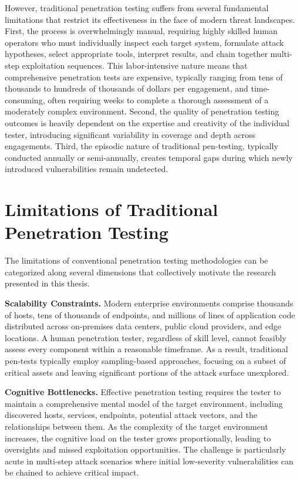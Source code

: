 However, traditional penetration testing suffers from several fundamental limitations that restrict its effectiveness in the face of modern threat landscapes. First, the process is overwhelmingly manual, requiring highly skilled human operators who must individually inspect each target system, formulate attack hypotheses, select appropriate tools, interpret results, and chain together multi-step exploitation sequences. This labor-intensive nature means that comprehensive penetration tests are expensive, typically ranging from tens of thousands to hundreds of thousands of dollars per engagement, and time-consuming, often requiring weeks to complete a thorough assessment of a moderately complex environment. Second, the quality of penetration testing outcomes is heavily dependent on the expertise and creativity of the individual tester, introducing significant variability in coverage and depth across engagements. Third, the episodic nature of traditional pen-testing, typically conducted annually or semi-annually, creates temporal gaps during which newly introduced vulnerabilities remain undetected.

\section{Limitations of Traditional Penetration Testing}
\label{sec:limitations}

The limitations of conventional penetration testing methodologies can be categorized along several dimensions that collectively motivate the research presented in this thesis.

\textbf{Scalability Constraints.} Modern enterprise environments comprise thousands of hosts, tens of thousands of endpoints, and millions of lines of application code distributed across on-premises data centers, public cloud providers, and edge locations. A human penetration tester, regardless of skill level, cannot feasibly assess every component within a reasonable timeframe. As a result, traditional pen-tests typically employ sampling-based approaches, focusing on a subset of critical assets and leaving significant portions of the attack surface unexplored.

\textbf{Cognitive Bottlenecks.} Effective penetration testing requires the tester to maintain a comprehensive mental model of the target environment, including discovered hosts, services, endpoints, potential attack vectors, and the relationships between them. As the complexity of the target environment increases, the cognitive load on the tester grows proportionally, leading to oversights and missed exploitation opportunities. The challenge is particularly acute in multi-step attack scenarios where initial low-severity vulnerabilities can be chained to achieve critical impact.

